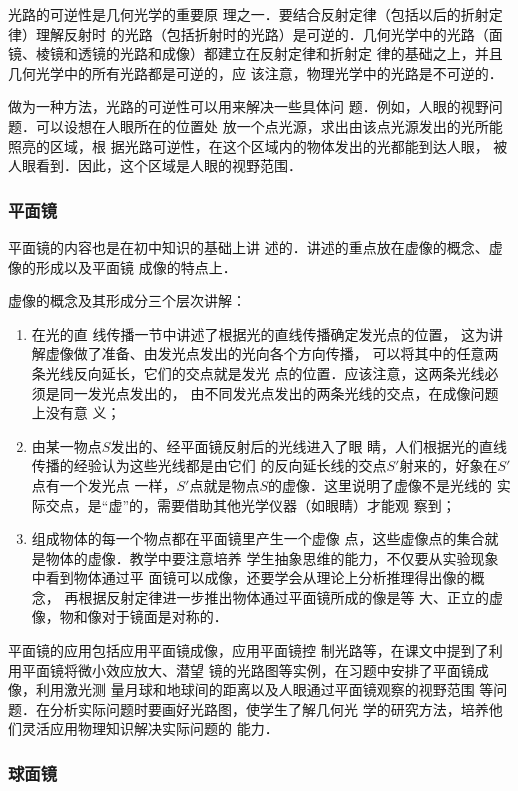 光路的可逆性是几何光学的重要原
理之一．要结合反射定律（包括以后的折射定律）理解反射时
的光路（包括折射时的光路）是可逆的．几何光学中的光路（面
镜、棱镜和透镜的光路和成像）都建立在反射定律和折射定
律的基础之上，并且几何光学中的所有光路都是可逆的，应
该注意，物理光学中的光路是不可逆的．

做为一种方法，光路的可逆性可以用来解决一些具体问
题．例如，人眼的视野问题．可以设想在人眼所在的位置处
放一个点光源，求出由该点光源发出的光所能照亮的区域，根
据光路可逆性，在这个区域内的物体发出的光都能到达人眼，
被人眼看到．因此，这个区域是人眼的视野范围．

\subsubsection{平面镜}

平面镜的内容也是在初中知识的基础上讲
述的．讲述的重点放在虚像的概念、虚像的形成以及平面镜
成像的特点上．

虚像的概念及其形成分三个层次讲解：
\begin{enumerate}
\item 在光的直
线传播一节中讲述了根据光的直线传播确定发光点的位置，
这为讲解虚像做了准备、由发光点发出的光向各个方向传播，
可以将其中的任意两条光线反向延长，它们的交点就是发光
点的位置．应该注意，这两条光线必须是同一发光点发出的，
由不同发光点发出的两条光线的交点，在成像问题上没有意
义；
\item 由某一物点$S$发出的、经平面镜反射后的光线进入了眼
睛，人们根据光的直线传播的经验认为这些光线都是由它们
的反向延长线的交点$S'$射来的，好象在$S'$点有一个发光点
一样，$S'$点就是物点$S$的虚像．这里说明了虚像不是光线的
实际交点，是“虚”的，需要借助其他光学仪器（如眼睛）才能观
察到；
\item 组成物体的每一个物点都在平面镜里产生一个虚像
点，这些虚像点的集合就是物体的虚像．教学中要注意培养
学生抽象思维的能力，不仅要从实验现象中看到物体通过平
面镜可以成像，还要学会从理论上分析推理得出像的概念，
再根据反射定律进一步推出物体通过平面镜所成的像是等
大、正立的虚像，物和像对于镜面是对称的．
\end{enumerate}

平面镜的应用包括应用平面镜成像，应用平面镜控
制光路等，在课文中提到了利用平面镜将微小效应放大、潜望
镜的光路图等实例，在习题中安排了平面镜成像，利用激光测
量月球和地球间的距离以及人眼通过平面镜观察的视野范围
等问题．在分析实际问题时要画好光路图，使学生了解几何光
学的研究方法，培养他们灵活应用物理知识解决实际问题的
能力．

\subsubsection{球面镜}

